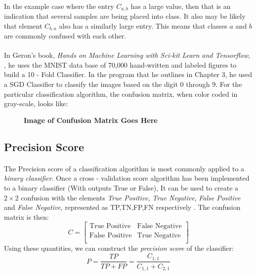 \documentclass[12pt,letterpaper]{article}
\begin{document}
\paragraph*{}In the example case where the entry $C_{a,b}$ has a large value, then that is an indication that several samples are being placed into class. It also may be likely that element $C_{b,a}$ also has a similarly large entry. This means that classes $a$ and $b$ are commonly confused with each other. 
\paragraph*{}In Geron's book, \textit{Hands on Machine Learning with Sci-kit Learn and Tensorflow}, \cite{Geron}, he uses the MNIST data base of 70,000 hand-written and labeled figures to build a 10 - Fold Classifier. In the program that he outlines in Chapter 3, he used a SGD Classifier to classify the images based on the digit $0$ through $9$. For the particular classification algorithm, the confusion matrix, when color coded in gray-scale, looks like:
\begin{figure}[H]
\begin{center}
\textbf{Image of Confusion Matrix Goes Here}
\end{center}
\end{figure}



\subsection{Precision Score}
\paragraph*{}The Precision score of a classification algorithm is most commonly applied to a \textit{binary classifier}. Once a cross - validation score algorithm has been implemented to a binary classifier (With outputs \textsf{True} or \textsf{False}), It can be used to create a $2 \times 2$ confusion with the elements \textit{True Positive}, \textit{True Negative}, \textit{False Positive} and \textit{False Negative}, represented as TP,TN,FP,FN respectively \cite{Gareth}. The confusion matrix is then:
\begin{equation}
C = 
\begin{bmatrix}
\text{True Positive} & \text{False Negative} \\
\text{False Positive} & \text{True Negative} \\
\end{bmatrix}
\end{equation}
Using these quantities, we can construct the \textit{precision score} of the classifier:
\begin{equation}
\label{precsision score}
P = \frac{TP}{TP + FP} = \frac{C_{1,1}}{C_{1,1}+C_{2,1}}
\end{equation}
\end{document}
